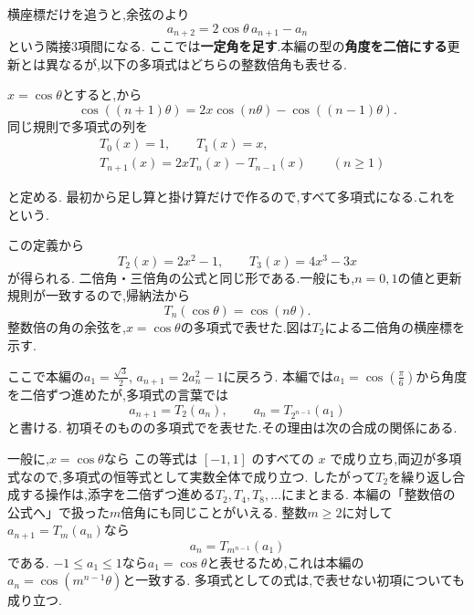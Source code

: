 横座標だけを追うと,余弦のより
\[
  a_{n+2}=2\cos\theta\,a_{n+1}-a_n
\]
という隣接3項間になる.
ここでは\textbf{一定角を足す}.本編の型の\textbf{角度を二倍にする}更新とは異なるが,以下の多項式はどちらの整数倍角も表せる.

$x=\cos\theta$とすると,から
\[
  \cos((n+1)\theta)=2x\cos(n\theta)-\cos((n-1)\theta).
\]
同じ規則で多項式の列を
\begin{align*}
  &T_0(x)=1,\qquad T_1(x)=x,\\
  &T_{n+1}(x)=2xT_n(x)-T_{n-1}(x)
  \qquad(n\ge1)
\end{align*}

と定める.
最初から足し算と掛け算だけで作るので,すべて多項式になる.これをという.

この定義から
\[
  T_2(x)=2x^2-1,\qquad
  T_3(x)=4x^3-3x
\]
が得られる.
二倍角・三倍角の公式と同じ形である.一般にも,$n=0,1$の値と更新規則が一致するので,帰納法から
\[
  T_n(\cos\theta)=\cos(n\theta).
\]
整数倍の角の余弦を,$x=\cos\theta$の多項式で表せた.図は$T_2$による二倍角の横座標を示す.
\BookFigChebyshev

ここで本編の$\displaystyle a_1=\frac{\sqrt3}{2}$, $a_{n+1}=2a_n^2-1$に戻ろう.
本編では$\displaystyle a_1=\cos(\frac{\pi}{6})$から角度を二倍ずつ進めたが,多項式の言葉では
\[
  a_{n+1}=T_2(a_n),\qquad
  a_n=T_{2^{n-1}}(a_1)
\]
と書ける.
初項そのものの多項式でを表せた.その理由は次の合成の関係にある.

一般に,$x=\cos\theta$なら
\BookMathLayout{\[
    T_m(T_k(x))
    =T_m(\cos(k\theta))
    =\cos(mk\theta)
    =T_{mk}(x).
  \]}{
  \[
    \begin{aligned}
      T_m(T_k(x))&=T_m(\cos(k\theta))\\
      &=\cos(mk\theta)=T_{mk}(x).
    \end{aligned}
  \]
}
この等式は $[-1,1]$ のすべての $x$ で成り立ち,両辺が多項式なので,多項式の恒等式として実数全体で成り立つ.
したがって$T_2$を繰り返し合成する操作は,添字を二倍ずつ進める$T_2,T_4,T_8,\ldots$にまとまる.
本編の「整数倍の公式へ」で扱った$m$倍角にも同じことがいえる.
整数$m\ge2$に対して$a_{n+1}=T_m(a_n)$なら
\[
  a_n=T_{m^{n-1}}(a_1)
\]
である.
$-1\le a_1\le1$なら$a_1=\cos\theta$と表せるため,これは本編の$a_n=\cos(m^{n-1}\theta)$と一致する.
多項式としての式は,で表せない初項についても成り立つ.

